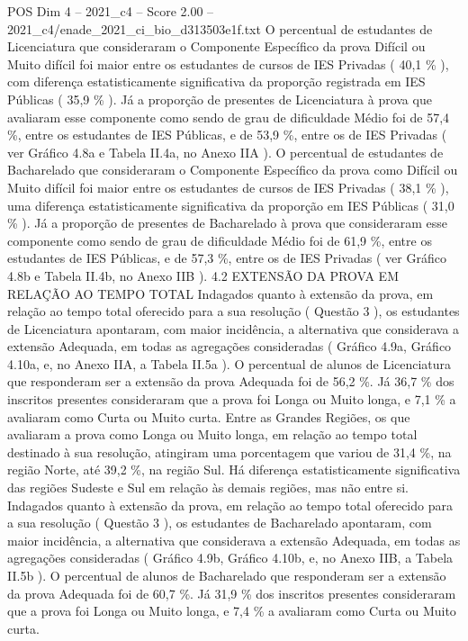 \begin{textsample}{POS Dim 4 – 2021\_c4 – Score 2.00 – 2021\_c4/enade\_2021\_ci\_bio\_d313503e1f.txt}
O percentual de estudantes de Licenciatura que consideraram o Componente Específico da prova Difícil ou Muito difícil foi maior entre os estudantes de cursos de IES Privadas ( 40,1 \% ), com diferença estatisticamente significativa da proporção registrada em IES Públicas ( 35,9 \% ).
Já a proporção de presentes de Licenciatura à prova que avaliaram esse componente como sendo de grau de dificuldade Médio foi de 57,4 \%, entre os estudantes de IES Públicas, e de 53,9 \%, entre os de IES Privadas ( ver Gráfico 4.8a e Tabela II.4a, no Anexo IIA ).
O percentual de estudantes de Bacharelado que consideraram o Componente Específico da prova como Difícil ou Muito difícil foi maior entre os estudantes de cursos de IES Privadas ( 38,1 \% ), uma diferença estatisticamente significativa da proporção em IES Públicas ( 31,0 \% ).
Já a proporção de presentes de Bacharelado à prova que consideraram esse componente como sendo de grau de dificuldade Médio foi de 61,9 \%, entre os estudantes de IES Públicas, e de 57,3 \%, entre os de IES Privadas ( ver Gráfico 4.8b e Tabela II.4b, no Anexo IIB ). 4.2 EXTENSÃO DA PROVA EM RELAÇÃO AO TEMPO TOTAL Indagados quanto à extensão da prova, em relação ao tempo total oferecido para a sua resolução ( Questão 3 ), os estudantes de Licenciatura apontaram, com maior incidência, a alternativa que considerava a extensão Adequada, em todas as agregações consideradas ( Gráfico 4.9a, Gráfico 4.10a, e, no Anexo IIA, a Tabela II.5a ).
O percentual de alunos de Licenciatura que responderam ser a extensão da prova Adequada foi de 56,2 \%.
Já 36,7 \% dos inscritos presentes consideraram que a prova foi Longa ou Muito longa, e 7,1 \% a avaliaram como Curta ou Muito curta.
Entre as Grandes Regiões, os que avaliaram a prova como Longa ou Muito longa, em relação ao tempo total destinado à sua resolução, atingiram uma porcentagem que variou de 31,4 \%, na região Norte, até 39,2 \%, na região Sul.
Há diferença estatisticamente significativa das regiões Sudeste e Sul em relação às demais regiões, mas não entre si.
Indagados quanto à extensão da prova, em relação ao tempo total oferecido para a sua resolução ( Questão 3 ), os estudantes de Bacharelado apontaram, com maior incidência, a alternativa que considerava a extensão Adequada, em todas as agregações consideradas ( Gráfico 4.9b, Gráfico 4.10b, e, no Anexo IIB, a Tabela II.5b ).
O percentual de alunos de Bacharelado que responderam ser a extensão da prova Adequada foi de 60,7 \%.
Já 31,9 \% dos inscritos presentes consideraram que a prova foi Longa ou Muito longa, e 7,4 \% a avaliaram como Curta ou Muito curta.

\end{textsample}
